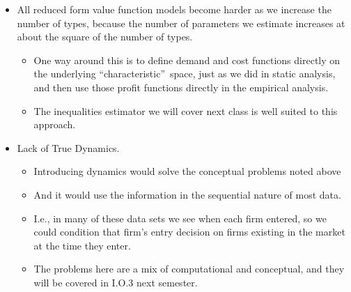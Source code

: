 \documentclass[notes=show]{beamer}
\begin{document}
\begin{frame}%


\begin{itemize}
\item All reduced form value function models become harder as we increase
the number of types, because the number of parameters we estimate increases
at about the square of the number of types.

\begin{itemize}
\item One way around this is to define demand and cost functions directly on
the underlying \textquotedblleft characteristic\textquotedblright\ space,
just as we did in static analysis, and then use those profit functions
directly in the empirical analysis.

\item The inequalities estimator we will cover next class is well suited to
this approach.
\end{itemize}

\item Lack of True Dynamics.

\begin{itemize}
\item Introducing dynamics would solve the conceptual problems noted above

\item And it would use the information in the sequential nature of most data.

\item I.e., in many of these data sets we see when each firm entered, so we
could condition that firm's entry decision on firms existing in the market
at the time they enter.

\item The problems here are a mix of computational and conceptual, and they
will be covered in I.O.3 next semester.
\end{itemize}
\end{itemize}

\end{frame}%
\end{document}
